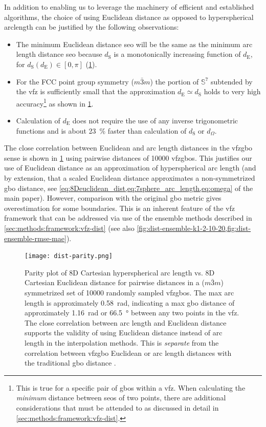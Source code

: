 \documentclass[preprint,12pt]{elsarticle}
\begin{document}
In addition to enabling us to leverage the machinery of efficient and established algorithms, the choice of using Euclidean distance as opposed to hyperspherical arclength can be justified by the following observations:
\begin{itemize}
	\item The minimum Euclidean distance \gls{seo} will be the same as the minimum arc length distance \gls{seo} because $d_{\text{S}}$ is a monotonically increasing function of $d_{\text{E}}$, for $d_{\text{S}}\!\left(d_{\text{E}}\right)\in[0,\pi]$ (\cref{fig:dist-parity}). 
	\item For the FCC point group symmetry ($m\bar{3}m$) the portion of $\mathbb{S}^7$ subtended by the \gls{vfz} is sufficiently small that the approximation $d_{\text{E}} \simeq d_{\text{S}}$ holds to very high accuracy\footnote{This is true for a specific pair of \glspl{gbo} within a \gls{vfz}. When calculating the \emph{minimum} distance between \glspl{seo} of two points, there are additional considerations that must be attended to as discussed in detail in \cref{sec:methods:framework:vfz-dist}.} as shown in \cref{fig:dist-parity}. 
	\item Calculation of $d_{\text{E}}$ does not require the use of any inverse trigonometric functions and is about \SI{23}{\percent} faster than calculation of $d_{\text{S}}$ or $d_\Omega$.
\end{itemize}

The close correlation between Euclidean and arc length distances in the \gls{vfzgbo} sense is shown in \cref{fig:dist-parity} using pairwise distances of \num{10000} \glspl{vfzgbo}. This justifies our use of Euclidean distance as an approximation of hyperspherical arc length (and by extension, that a scaled Euclidean distance approximates a non-symmetrized \gls{gbo} distance, see \cref{eq:8Deuclidean_dist,eq:7sphere_arc_length,eq:omega} of the main paper). However, comparison with the original \gls{gbo} metric \cite{francisGeodesicOctonionMetric2019} gives overestimation for some boundaries. This is an inherent feature of the \gls{vfz} framework that can be addressed via use of the ensemble methods described in \cref{sec:methods:framework:vfz-dist} (see also \cref{fig:dist-ensemble-k1-2-10-20,fig:dist-ensemble-rmse-mae}).

\begin{figure}
\centering
\texttt{[image: dist-parity.png]}
\caption{Parity plot of 8D Cartesian hyperspherical arc length vs. 8D Cartesian Euclidean distance for pairwise distances in a ($m\bar{3}m$) symmetrized set of \num{10000} randomly sampled \glspl{vfzgbo}. The max arc length is approximately \SI{0.58}{\radian}, indicating a max \gls{gbo} distance of approximately \SI{1.16}{\radian} or \SI{66.5}{\degree} between any two points in the \gls{vfz}. The close correlation between arc length and Euclidean distance supports the validity of using Euclidean distance instead of arc length in the interpolation methods. This is \textit{separate} from the correlation between \gls{vfzgbo} Euclidean or arc length distances with the traditional \gls{gbo} distance \cite{chesserLearningGrainBoundary2020}.}
\label{fig:dist-parity}
\end{figure}
\end{document}
